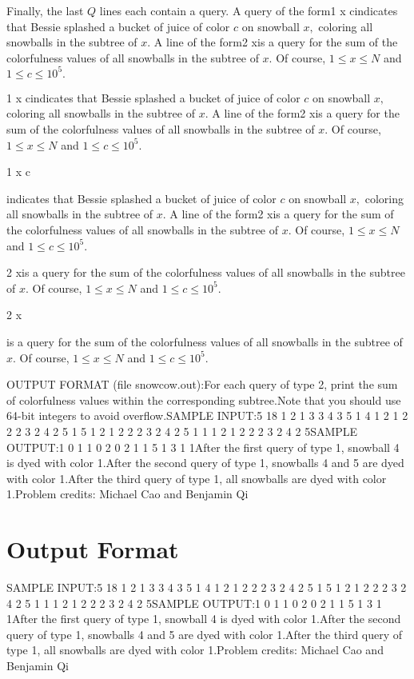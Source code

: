 \documentclass[12pt]{article}
\begin{document}
Finally, the last $Q$ lines each contain a query.  A query of the form1 x cindicates that Bessie splashed a bucket of juice of color $c$ on snowball $x,$
coloring all snowballs in the subtree of $x$. A line of the form2 xis a query for the sum of the colorfulness values of all snowballs in the
subtree of $x$. Of course, $1\le x\le N$ and $1\le c\le 10^5.$

1 x cindicates that Bessie splashed a bucket of juice of color $c$ on snowball $x,$
coloring all snowballs in the subtree of $x$. A line of the form2 xis a query for the sum of the colorfulness values of all snowballs in the
subtree of $x$. Of course, $1\le x\le N$ and $1\le c\le 10^5.$

1 x c

indicates that Bessie splashed a bucket of juice of color $c$ on snowball $x,$
coloring all snowballs in the subtree of $x$. A line of the form2 xis a query for the sum of the colorfulness values of all snowballs in the
subtree of $x$. Of course, $1\le x\le N$ and $1\le c\le 10^5.$

2 xis a query for the sum of the colorfulness values of all snowballs in the
subtree of $x$. Of course, $1\le x\le N$ and $1\le c\le 10^5.$

2 x

is a query for the sum of the colorfulness values of all snowballs in the
subtree of $x$. Of course, $1\le x\le N$ and $1\le c\le 10^5.$

OUTPUT FORMAT (file snowcow.out):For each query of type 2, print the sum of colorfulness values within 
the corresponding subtree.Note that you should use 64-bit integers to avoid overflow.SAMPLE INPUT:5 18
1 2
1 3
3 4
3 5
1 4 1
2 1
2 2
2 3
2 4
2 5
1 5 1
2 1
2 2
2 3
2 4
2 5
1 1 1
2 1
2 2
2 3
2 4
2 5SAMPLE OUTPUT:1
0
1
1
0
2
0
2
1
1
5
1
3
1
1After the first query of type 1, snowball 4 is dyed with color 1.After the second query of type 1, snowballs 4 and 5 are dyed with color 1.After the third query of type 1, all snowballs are dyed with color 1.Problem credits: Michael Cao and Benjamin Qi

\section*{Output Format}
SAMPLE INPUT:5 18
1 2
1 3
3 4
3 5
1 4 1
2 1
2 2
2 3
2 4
2 5
1 5 1
2 1
2 2
2 3
2 4
2 5
1 1 1
2 1
2 2
2 3
2 4
2 5SAMPLE OUTPUT:1
0
1
1
0
2
0
2
1
1
5
1
3
1
1After the first query of type 1, snowball 4 is dyed with color 1.After the second query of type 1, snowballs 4 and 5 are dyed with color 1.After the third query of type 1, all snowballs are dyed with color 1.Problem credits: Michael Cao and Benjamin Qi
\end{document}

